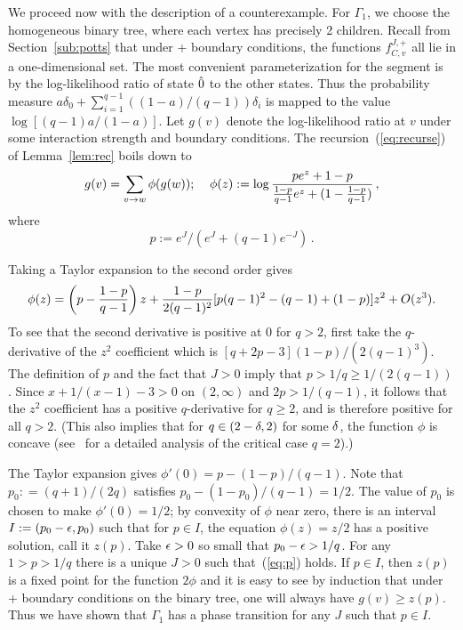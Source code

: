 We proceed now with the description of a counterexample.
For $\Gamma_1$, we choose the homogeneous binary tree, where each vertex
has precisely 2 children.  Recall from
Section~\ref{sub:potts} that under + boundary conditions, the functions
$f^{J , +}_{C , v}$ all lie in a one-dimensional set.  The most
convenient parameterization for the segment is by the log-likelihood ratio
of state ${\hat{0}}$ to the other states.  
Thus the probability measure $a \delta_0 + \sum_{i=1}^{q-1}
((1-a)/(q-1)) \delta_i$ is mapped to the value $\log [(q-1) a / (1-a)]$.
Let $g(v)$ denote the log-likelihood ratio at $v$ under some interaction
strength and boundary conditions.  
The recursion~(\ref{eq:recurse}) of Lemma~\ref{lem:rec} boils down to 
$$g(v) = \sum_{v \rightarrow w} \phi (g(w)) ; \;\;\;\; \phi (z) := \log 
   { p e^z + 1-p \over {1-p \over q-1} e^z + (1 - {1-p \over q-1})} \, ,$$
where 
\begin{equation} \label{eq:p}
p := e^J / (e^J + (q-1) e^{-J}) \, .  
\end{equation}

Taking a Taylor expansion to the second order gives
$$\phi (z) = \left ( p - {1-p \over q-1} \right ) z + {1-p \over 2 (q-1)^2}
   [p(q-1)^2 - (q-1) + (1-p)] z^2 + O(z^3) .$$
To see that the second derivative is positive at 0
for $q > 2$, first take the $q$-derivative of the $z^2$ coefficient which is
$[q+2p-3](1-p)/(2(q-1)^3)$.
The definition of $p$ and the fact that $J > 0$ imply
that $p > 1/q \geq 1/(2(q-1))$. Since $x+1/(x-1) -3 >0$ on $(2,\infty)$
and $2p> 1/(q-1)$,
it follows that the $z^2$ coefficient has a positive
$q$-derivative for $q \ge 2$, and is therefore positive for all $q > 2$.  
(This also implies that for $q\in (2-\delta,2)$ for some $\delta$,
the function $\phi$ is concave (see~\cite{PP} for a detailed analysis of
the critical case $q=2$).)  

The Taylor expansion gives $\phi'(0) = p - (1-p)/(q-1)$. Note that
$p_0: = (q+1)/(2q)$ satisfies $p_0 - (1 - p_0) / (q-1) = 1/2$.  
The value of $p_0$ is chosen to make $\phi' (0) = 1/2$; by
convexity of $\phi$ near zero, there is an interval 
$I := (p_0 - \epsilon , p_0)$ such that for $p \in I$, the equation
$\phi (z) = z/2$ has a positive solution, call it $z(p)$. Take
$\epsilon>0$ so small that $p_0 -\epsilon > 1/q$.
For any $1>p > 1/q$ there is a unique $J > 0$ such that~(\ref{eq:p})
holds.  If $p \in I$, then $z(p)$ is a fixed point for the function
$2 \phi$ and it is easy to see by induction that under + boundary conditions 
on the binary tree, one will always have $g(v) \geq z(p)$.  Thus
we have shown that $\Gamma_1$ has a phase transition for any
$J$ such that $p \in I$.  

